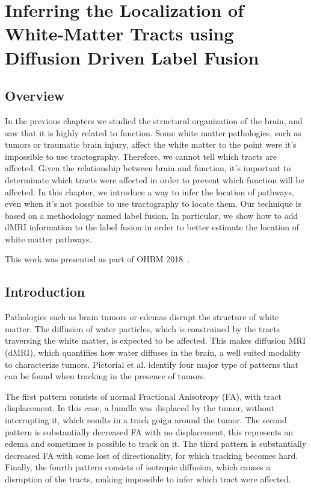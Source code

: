 \chapter{Inferring the Localization of White-Matter Tracts using Diffusion Driven Label Fusion}

\section{Overview}
In the previous chapters we studied the structural organization of the brain,
and saw that it is highly related to function. Some white matter pathologies,
such as tumors or traumatic brain injury, affect the white matter to the point
were it's impossible to use tractography. Therefore, we cannot tell which
tracts are affected. Given the relationship between brain and function, it's
important to determinate which tracts were affected in order to prevent
which function will be affected.
In this chapter, we introduce a way to infer the location of pathways, even
when it's not possible to use tractography to locate them. Our technique is
based on a methodology named label fusion. In particular, we show how to add
dMRI information to the label fusion in order to better estimate the location
of white matter pathways.

This work was presented as part of OHBM 2018~\cite{Guillermo2018}.

\section{Introduction}

Pathologies such as brain tumors or edemas disrupt the structure of white
matter. The diffusion of water particles, which is constrained by the
tracts traversing the white matter, is expected to be affected. This makes
diffusion MRI (dMRI), which quantifies how water diffuses in the brain, a well
suited modality to characterize tumors. Pictorial et al.\cite{Pictorial2004}
identify four major type of patterns that can be found when tracking in the
presence of tumors. 

The first pattern consists of normal Fractional Anisotropy (FA), with tract
displacement. In this case, a bundle was displaced by the tumor, without
interrupting it, which results in a track goign around the tumor. The second
pattern is substantially decreased FA with no displacement, this represents an
edema and sometimes is possible to track on it. The third pattern is substantially
decreased FA with some lost of directionality, for which tracking becomes hard.
Finally, the fourth pattern consists of isotropic diffusion, which causes 
a disruption of the tracts, making impossible to infer which tract were affected.

